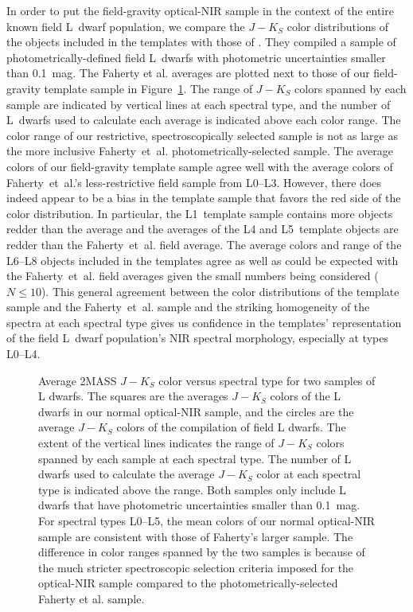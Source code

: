 \documentclass[modern]{aastex61}
\begin{document}
In order to put the field-gravity optical-NIR sample in the context of the entire known field L~dwarf population, we compare the $J-K_S$ color distributions of the objects included in the templates with those of \citet{Faherty13_0355}.
They compiled a sample of photometrically-defined field L~dwarfs with photometric uncertainties smaller than 0.1~mag.
The Faherty et al. averages are plotted next to those of our field-gravity template sample in Figure~\ref{fig:JK_colors_F13}.
The range of $J-K_S$ colors spanned by each sample are indicated by vertical lines at each spectral type, and the number of L~dwarfs used to calculate each average is indicated above each color range.
The color range of our restrictive, spectroscopically selected sample is not as large as the more inclusive Faherty~et~al. photometrically-selected sample.
The average colors of our field-gravity template sample agree well with the average colors of Faherty~et~al.'s less-restrictive field sample from L0--L3.
However, there does indeed appear to be a bias in the template sample that favors the red side of the color distribution.
In particular, the L1~template sample contains more objects redder than the average and the averages of the L4 and L5~template objects are redder than the Faherty~et~al. field average.
The average colors and range of the L6--L8 objects included in the templates agree as well as could be expected with the Faherty~et~al. field averages given the small numbers being considered ($N\le10$).
This general agreement between the color distributions of the template sample and the Faherty~et~al. sample and the striking homogeneity of the spectra at each spectral type gives us confidence in the templates' representation of the field L~dwarf population's NIR spectral morphology, especially at types L0--L4.

\begin{figure}
    \caption{Average 2MASS $J-K_S$ color versus spectral type for two samples of L dwarfs. The squares are the averages $J-K_S$ colors of the L dwarfs in our normal optical-NIR sample, and the circles are the average $J-K_S$ colors of the \citet{Faherty13_0355} compilation of field L dwarfs. The extent of the vertical lines indicates the range of $J-K_S$ colors spanned by each sample at each spectral type. The number of L dwarfs used to calculate the average $J-K_S$ color at each spectral type is indicated above the range. Both samples only include L dwarfs that have photometric uncertainties smaller than 0.1~mag. For spectral types L0--L5, the mean colors of our normal optical-NIR sample are consistent with those of Faherty's larger sample. The difference in color ranges spanned by the two samples is because of the much stricter spectroscopic selection criteria imposed for the optical-NIR sample compared to the photometrically-selected Faherty et al. sample.}
  \label{fig:JK_colors_F13}
\end{figure}
\end{document}
